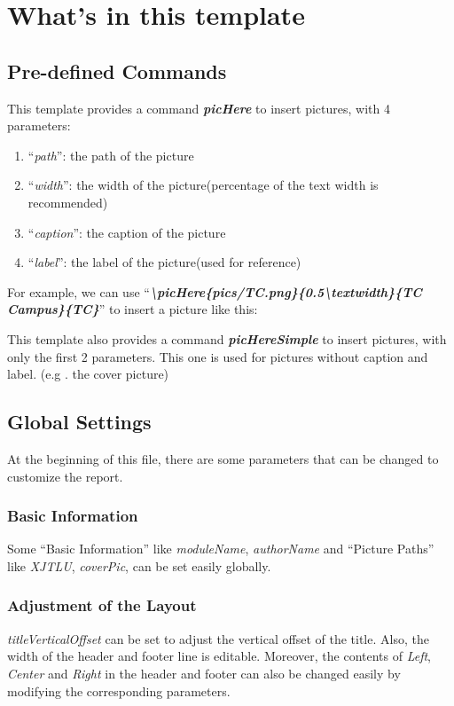 \documentclass{article}
\begin{document}
\newpage
\section{What's in this template}
\subsection{Pre-defined Commands}
\noindent This template provides a command \textit{\textbf{picHere}} to insert pictures, with 4 parameters:
\begin{enumerate}
    \item ``\textit{path}'': the path of the picture
    \item ``\textit{width}'': the width of the picture(percentage of the text width is recommended)
    \item ``\textit{caption}'': the caption of the picture
    \item ``\textit{label}'': the label of the picture(used for reference)
\end{enumerate}

\noindent For example, we can use ``\textit{\textbf{\textbackslash picHere\{pics/TC.png\}\{0.5\textbackslash textwidth\}\{TC Campus\}\{TC\}}}'' to insert a picture like this:

This template also provides a command \textit{\textbf{picHereSimple}} to insert pictures, 
with only the first 2 parameters. 
This one is used for pictures without caption and label. (e.g . the cover picture)

\subsection{Global Settings}
At the beginning of this file, there are some parameters that can be changed to customize the report. 
\subsubsection{Basic Information}
Some ``Basic Information'' like \textit{moduleName}, \textit{authorName} and ``Picture Paths'' like \textit{XJTLU}, \textit{coverPic}, 
can be set easily globally. 

\subsubsection{Adjustment of the Layout}
\textit{titleVerticalOffset} can be set to adjust the vertical offset of the title.
Also, the width of the header and footer line is editable. 
Moreover, the contents of \textit{Left}, \textit{Center} and \textit{Right} in the header and footer can also be changed easily by modifying the corresponding parameters.
\end{document}
